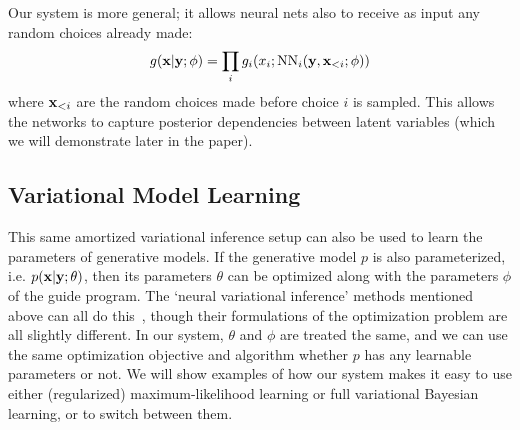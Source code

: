 Our system is more general; it allows neural nets also to receive as input any random choices already made:
\begin{equation*}
g(\mathbf{x} | \mathbf{y} ; \phi) = \prod_i g_i(x_i ; \text{NN}_i(\mathbf{y}, \mathbf{x}_{<i} ; \phi))
\end{equation*}
where $\mathbf{x}_{<i}$ are the random choices made before choice $i$ is sampled. This allows the networks to capture posterior dependencies between latent variables (which we will demonstrate later in the paper).

\subsection{Variational Model Learning}

This same amortized variational inference setup can also be used to learn the parameters of generative models. If the generative model $p$ is also parameterized, i.e. $p(\mathbf{x} | \mathbf{y} ; \theta)$, then its parameters $\theta$ can be optimized along with the parameters $\phi$ of the guide program.
The `neural variational inference' methods mentioned above can all do this~\cite{NVIL,DLGM,AEVB}, though their formulations of the optimization problem are all slightly different.
In our system, $\theta$ and $\phi$ are treated the same, and we can use the same optimization objective and algorithm whether $p$ has any learnable parameters or not.
We will show examples of how our system makes it easy to use either (regularized) maximum-likelihood learning or full variational Bayesian learning, or to switch between them.

